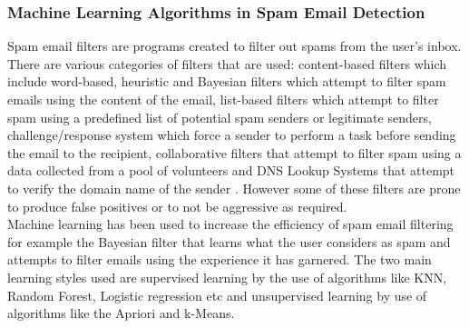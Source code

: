 \subsubsection{Machine Learning Algorithms in Spam Email Detection}
Spam email filters are programs created to filter out spams from the user's inbox. There are various categories of filters that are used: content-based filters which include  word-based, heuristic and Bayesian filters which attempt to filter spam emails using the content of the email, list-based filters which attempt to filter spam using a predefined list of potential spam senders or legitimate senders, challenge/response system which force a sender to perform a task before sending the email to the recipient, collaborative filters that attempt to filter spam using a data collected from a pool of volunteers and DNS Lookup Systems that attempt to verify the domain name of the sender \cite{tewari_jangale_2016}. However some of these filters are prone to produce false positives or to not be aggressive as required.\\
Machine learning has been used to increase the efficiency of spam email filtering for example the Bayesian filter that learns what the user considers as spam and attempts to filter emails using the experience it has garnered. The two main learning styles used are supervised learning by the use of algorithms like KNN, Random Forest, Logistic regression etc and unsupervised learning by use of algorithms like the Apriori and k-Means.